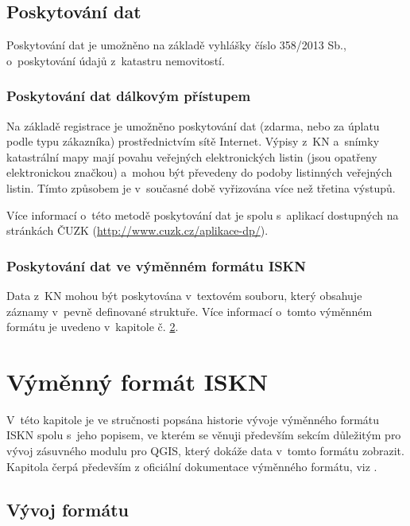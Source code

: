\documentclass[a4paper,12pt,oneside]{book}
\begin{document}
\section{Poskytování dat}

Poskytování dat je umožněno na základě vyhlášky číslo 358/2013 Sb.,
o~poskytování údajů z~katastru nemovitostí.

\subsection{Poskytování dat dálkovým přístupem}

Na základě registrace je umožněno poskytování dat (zdarma, nebo za
úplatu podle typu zákazníka) prostřednictvím sítě Internet. Výpisy
z~KN a~snímky katastrální mapy mají povahu veřejných elektronických
listin (jsou opatřeny elektronickou značkou) a~mohou být převedeny do
podoby listinných veřejných listin. Tímto způsobem je v~současné době
vyřizována více než třetina výstupů. 

Více informací o~této metodě poskytování dat je spolu s~aplikací
dostupných na stránkách ČUZK (\url{http://www.cuzk.cz/aplikace-dp/}).

\subsection{Poskytování dat ve výměnném formátu ISKN}

Data z~KN mohou být poskytována v~textovém souboru, který obsahuje
záznamy v~pevně definované struktuře. Více informací o~tomto výměnném
formátu je uvedeno v~kapitole č. \ref{l_format_vfk}.


\clearpage
\chapter{Výměnný formát ISKN}
\label{l_format_vfk}

V~této kapitole je ve stručnosti popsána historie vývoje výměnného
formátu ISKN spolu s~jeho popisem, ve kterém se věnuji především
sekcím důležitým pro vývoj zásuvného modulu pro QGIS, který dokáže
data v~tomto formátu zobrazit. Kapitola čerpá především z oficiální
dokumentace výměnného formátu, viz \cite{vfk_struktura}.


\section{Vývoj formátu}
\end{document}
